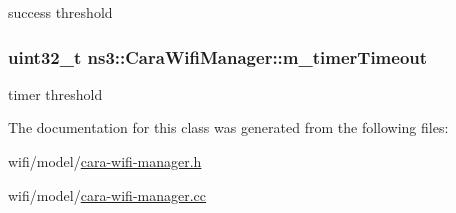 success threshold 

\subsubsection[{\texorpdfstring{m\+\_\+timer\+Timeout}{m_timerTimeout}}]{\setlength{\rightskip}{0pt plus 5cm}uint32\+\_\+t ns3\+::\+Cara\+Wifi\+Manager\+::m\+\_\+timer\+Timeout\hspace{0.3cm}{\ttfamily [private]}}\hypertarget{classns3_1_1CaraWifiManager_a68e0514247378508cad244e261e7fc3d}{}\label{classns3_1_1CaraWifiManager_a68e0514247378508cad244e261e7fc3d}


timer threshold 



The documentation for this class was generated from the following files\+:\begin{DoxyCompactItemize}
\item 
wifi/model/\hyperlink{cara-wifi-manager_8h}{cara-\/wifi-\/manager.\+h}\item 
wifi/model/\hyperlink{cara-wifi-manager_8cc}{cara-\/wifi-\/manager.\+cc}\end{DoxyCompactItemize}

